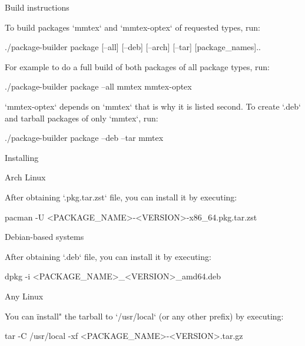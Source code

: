 \secc Build instructions

To build packages `mmtex` and `mmtex-optex` of requested types, run:

\begtt
./package-builder package [--all] [--deb] [--arch] [--tar] [package_names]..
\endtt

For example to do a full build of both packages of all package types, run:

\begtt
./package-builder package --all mmtex mmtex-optex
\endtt

`mmtex-optex` depends on `mmtex` that is why it is listed second. To create `.deb` and tarball packages of only `mmtex`, run:

\begtt
./package-builder package --deb --tar mmtex
\endtt

\sec Installing \MMTeX

\secc Arch Linux

After obtaining `.pkg.tar.zst` file, you can install it by executing:

\begtt
pacman -U <PACKAGE_NAME>-<VERSION>-x86_64.pkg.tar.zst
\endtt

\secc Debian-based systems

After obtaining `.deb` file, you can install it by executing:

\begtt
dpkg -i <PACKAGE_NAME>_<VERSION>_amd64.deb
\endtt

\secc Any Linux

You can \"install" the tarball to `/usr/local` (or any other prefix) by
executing:

\begtt
tar -C /usr/local -xf <PACKAGE_NAME>-<VERSION>.tar.gz
\endtt

\bye
